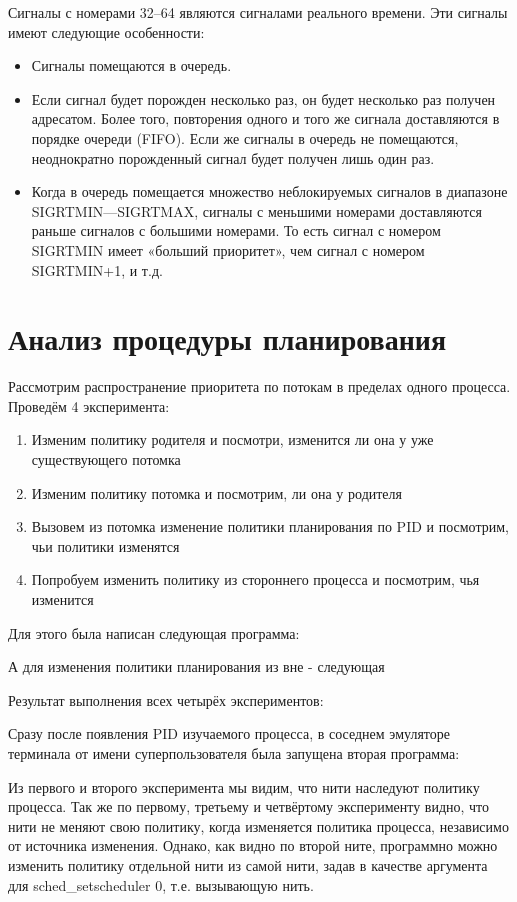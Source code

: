 \documentclass[a4paper]{article}
\begin{document}
	Сигналы с номерами 32--64 являются сигналами реального времени. Эти сигналы имеют следующие особенности:
	\begin{itemize}
		\item Сигналы помещаются в очередь.
		\item Если сигнал будет порожден несколько раз, он будет несколько раз получен адресатом. Более того, повторения одного и того же сигнала доставляются в порядке очереди (FIFO). Если же сигналы в очередь не помещаются, неоднократно порожденный сигнал будет получен лишь один раз.
		\item Когда в очередь помещается множество неблокируемых сигналов в диапазоне SIGRTMIN—SIGRTMAX, сигналы с меньшими номерами доставляются раньше сигналов с большими номерами. То есть сигнал с номером SIGRTMIN имеет «больший приоритет», чем сигнал с номером SIGRTMIN+1, и т.д.
	\end{itemize}

	\section{Анализ процедуры планирования}
	Рассмотрим распространение приоритета по потокам в пределах одного процесса. Проведём 4 эксперимента:
\begin{enumerate}
	\item Изменим политику родителя и посмотри, изменится ли она у уже существующего потомка
	\item Изменим политику потомка и посмотрим, ли она у родителя
	\item Вызовем из потомка изменение политики планирования по PID и посмотрим, чьи политики изменятся
	\item Попробуем изменить политику из стороннего процесса и посмотрим, чья изменится
\end{enumerate}		
	 Для этого была написан следующая программа:
	
	А для изменения политики планирования из вне - следующая
	
	Результат выполнения всех четырёх экспериментов:
	
	Сразу после появления PID изучаемого процесса, в соседнем эмуляторе терминала от имени суперпользователя была запущена вторая программа:
	
	Из первого и второго эксперимента мы видим, что нити наследуют политику процесса. Так же по первому, третьему и четвёртому эксперименту видно, что нити не меняют свою политику, когда изменяется политика процесса, независимо от источника изменения. Однако, как видно по второй ните, программно можно изменить политику отдельной нити из самой нити, задав в качестве аргумента для sched\_setscheduler 0, т.е. вызывающую нить.
\end{document}
